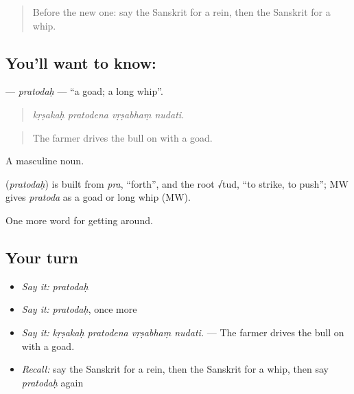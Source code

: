 \label{lesson:SA-C407-pratodah}



\begin{quote}
Before the new one: say the Sanskrit for a rein, then the Sanskrit for a whip.
\end{quote}

\subsection*{You'll want to know: }
\textbf{} — \emph{pratodaḥ} — \textquotedblleft{}a goad; a long whip\textquotedblright{}.

\begin{quote}
   
\end{quote}

\begin{quote}
\emph{kṛṣakaḥ pratodena vṛṣabhaṃ nudati.}
\end{quote}

\begin{quote}
The farmer drives the bull on with a goad.
\end{quote}

A masculine noun.

\begin{cousinweb}
\textbf{} (\emph{pratodaḥ}) is built from \emph{pra}, \textquotedblleft{}forth\textquotedblright{}, and the root √tud, \textquotedblleft{}to strike, to push\textquotedblright{}; MW gives \emph{pratoda} as a goad or long whip (MW).
\end{cousinweb}

\begin{grammarlens}[title={What you've built}]
One more word for getting around.
\end{grammarlens}

\subsection*{Your turn}
\begin{itemize}
\raggedright
  \item \emph{Say it:} \emph{pratodaḥ}
  \item \emph{Say it:} \emph{pratodaḥ}, once more
  \item \emph{Say it:} \emph{kṛṣakaḥ pratodena vṛṣabhaṃ nudati.} — The farmer drives the bull on with a goad.
  \item \emph{Recall:} say the Sanskrit for a rein, then the Sanskrit for a whip, then say \emph{pratodaḥ} again
\end{itemize}

